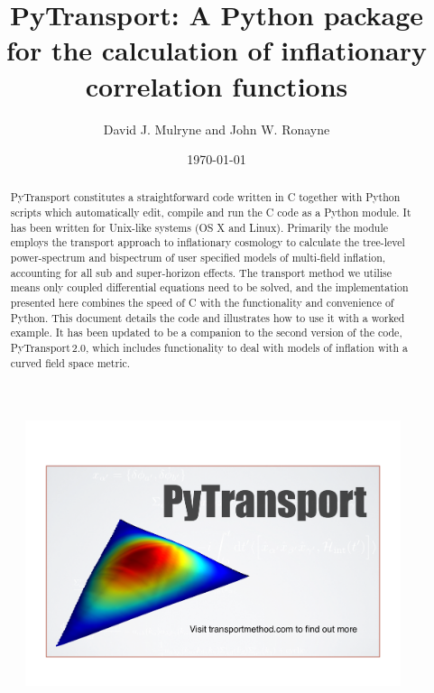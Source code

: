 \documentclass[10pt,
amsmath,amssymb,
aps,prd,nofootinbib,eqsecnum,a4paper]{revtex4}
\newcommand{\CC}{C\nolinebreak\hspace{-.05em}\raisebox{.4ex}{\tiny\bf +}\nolinebreak\hspace{-.10em}\raisebox{.4ex}{\tiny\bf +}}
\def\CC{{C\nolinebreak[4]\hspace{-.05em}\raisebox{.4ex}{\tiny\bf ++}}}
\def\S{ }
\begin{document}
\title{PyTransport: A Python package for the calculation of inflationary correlation functions}
\author{David J. Mulryne and John W. Ronayne}

\date{\today}

\begin{abstract}

\noindent PyTransport constitutes a straightforward code written in \CC \S  together 
with Python scripts which automatically edit, compile and run the \CC \S code as a 
Python module. It has been written for Unix-like systems (OS X and Linux).
Primarily the module employs the transport approach to inflationary cosmology to calculate 
the tree-level power-spectrum and bispectrum of user specified models of multi-field inflation, 
accounting for all sub and super-horizon effects.
The transport method we utilise means 
only coupled differential equations need to be solved, and the implementation presented here 
combines the speed of \CC \S  with the functionality and convenience of Python. This document details the code and illustrates how to use it with a worked example. It has been updated to 
be a companion to the second version of the code, 
PyTransport\,2.0, which includes functionality to deal with models of inflation with a curved 
field space metric. 


\end{abstract}

\maketitle





\begin{figure}[H]
\centering
\includegraphics[width=11cm]{PyTransLogo}
\end{figure}
\end{document}
